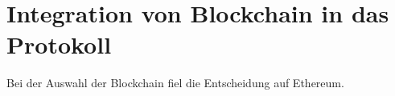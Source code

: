 \section{Integration von Blockchain in das Protokoll}
Bei der Auswahl der Blockchain fiel die Entscheidung auf Ethereum.